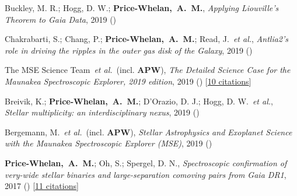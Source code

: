 \item[{\color{deemph}\scriptsize6}]Buckley, M. R.; Hogg, D. W.; \textbf{Price-Whelan,~A.~M.}, \textit{Applying Liouville's Theorem to Gaia Data}, 2019 ()

\item[{\color{deemph}\scriptsize5}]Chakrabarti, S.; Chang, P.; \textbf{Price-Whelan,~A.~M.}; Read, J.~\textit{et al.}, \textit{Antlia2's role in driving the ripples in the outer gas disk of the Galaxy}, 2019 ()

\item[{\color{deemph}\scriptsize4}]The MSE Science Team~\textit{et al.}~(incl. \textbf{APW}), \textit{The Detailed Science Case for the Maunakea Spectroscopic Explorer, 2019 edition}, 2019 () [\href{http://adsabs.harvard.edu/abs/2019arXiv190404907T}{10 citations}]

\item[{\color{deemph}\scriptsize3}]Breivik, K.; \textbf{Price-Whelan,~A.~M.}; D'Orazio, D. J.; Hogg, D. W.~\textit{et al.}, \textit{Stellar multiplicity: an interdisciplinary nexus}, 2019 ()

\item[{\color{deemph}\scriptsize2}]Bergemann, M.~\textit{et al.}~(incl. \textbf{APW}), \textit{Stellar Astrophysics and Exoplanet Science with the Maunakea Spectroscopic Explorer (MSE)}, 2019 ()

\item[{\color{deemph}\scriptsize1}]\textbf{Price-Whelan,~A.~M.}; Oh, S.; Spergel, D. N., \textit{Spectroscopic confirmation of very-wide stellar binaries and large-separation comoving pairs from Gaia DR1}, 2017 () [\href{http://adsabs.harvard.edu/abs/2017arXiv170903532P}{11 citations}]
